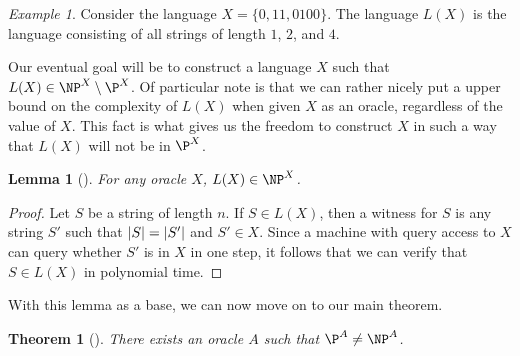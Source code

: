 \documentclass[english]{reedthesis}
\theoremstyle{plain}
\newtheorem{thm}{Theorem}[section]
\newtheorem{lemma}[lemma]{Lemma}
\theoremstyle{definition}
\theoremstyle{remark}
\newtheorem{example}{Example}[thm]
\DeclarePairedDelimiter{\abs}{\lvert}{\rvert}
\begin{document}
\begin{example}\label{ex:l(x)-simple}
  Consider the language $X = \{0, 11, 0100\}$. The language $L(X)$ is the
  language consisting of all strings of length $1$, $2$, and $4$.
\end{example}

Our eventual goal will be to construct a language $X$ such that
$L(X) \in \NP^{X} \setminus \P^{X}$. Of particular note is that we can rather nicely put a
upper bound on the complexity of $L(X)$ when given $X$ as an oracle, regardless
of the value of $X$. This fact is what gives us the freedom to construct $X$ in
such a way that $L(X)$ will not be in $\P^{X}$.

\begin{lemma}[{\cite[436]{BGS75}}]\label{lem:l(x)-in-np}
  For any oracle $X$, $L(X) \in \NP^{X}$.
\end{lemma}

\begin{proof}
  Let $S$ be a string of length $n$. If $S \in L(X)$, then a witness for $S$ is
  any string $S'$ such that $\abs{S} = \abs{S'}$ and $S' \in X$. Since a machine
  with query access to $X$ can query whether $S'$ is in $X$ in one step, it
  follows that we can verify that $S \in L(X)$ in polynomial time.
\end{proof}

With this lemma as a base, we can now move on to our main theorem.

\begin{thm}[{\cite[Theorem 3]{BGS75}}]\label{thm:p-np-nrel}
  There exists an oracle $A$ such that $\P^{A} \ne \NP^{A}$.
\end{thm}
\end{document}
